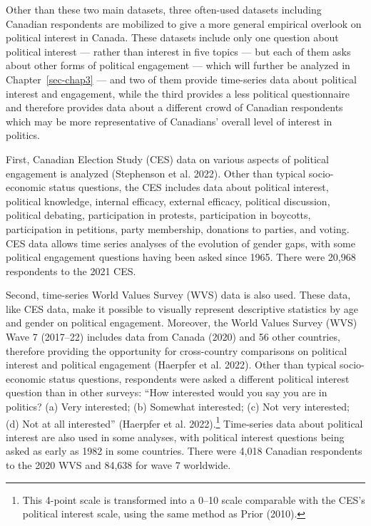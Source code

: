 \documentclass[
  letterpaper,
  DIV=11,
  numbers=noendperiod]{scrreprt}
\begin{document}
Other than these two main datasets, three often-used datasets including
Canadian respondents are mobilized to give a more general empirical
overlook on political interest in Canada. These datasets include only
one question about political interest --- rather than interest in five
topics --- but each of them asks about other forms of political
engagement --- which will further be analyzed in Chapter~\ref{sec-chap3}
--- and two of them provide time-series data about political interest
and engagement, while the third provides a less political questionnaire
and therefore provides data about a different crowd of Canadian
respondents which may be more representative of Canadians' overall level
of interest in politics.

First, Canadian Election Study (CES) data on various aspects of
political engagement is analyzed (Stephenson et al. 2022). Other than
typical socio-economic status questions, the CES includes data about
political interest, political knowledge, internal efficacy, external
efficacy, political discussion, political debating, participation in
protests, participation in boycotts, participation in petitions, party
membership, donations to parties, and voting. CES data allows time
series analyses of the evolution of gender gaps, with some political
engagement questions having been asked since 1965. There were 20,968
respondents to the 2021 CES.

Second, time-series World Values Survey (WVS) data is also used. These
data, like CES data, make it possible to visually represent descriptive
statistics by age and gender on political engagement. Moreover, the
World Values Survey (WVS) Wave 7 (2017--22) includes data from Canada
(2020) and 56 other countries, therefore providing the opportunity for
cross-country comparisons on political interest and political engagement
(Haerpfer et al. 2022). Other than typical socio-economic status
questions, respondents were asked a different political interest
question than in other surveys: ``How interested would you say you are
in politics? (a) Very interested; (b) Somewhat interested; (c) Not very
interested; (d) Not at all interested'' (Haerpfer et al.
2022).\footnote{This 4-point scale is transformed into a 0--10 scale
  comparable with the CES's political interest scale, using the same
  method as Prior (2010).} Time-series data about political interest are
also used in some analyses, with political interest questions being
asked as early as 1982 in some countries. There were 4,018 Canadian
respondents to the 2020 WVS and 84,638 for wave 7 worldwide.
\end{document}
